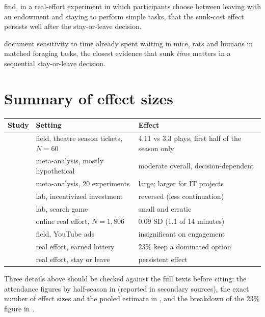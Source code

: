 \documentclass[11pt]{article}
\begin{document}
\citet{banerjee2019} find, in a real-effort experiment in which participants choose between leaving with an endowment and staying to perform simple tasks, that the sunk-cost effect persists well after the stay-or-leave decision.

\citet{sweis2018} document sensitivity to time already spent waiting in mice, rats and humans in matched foraging tasks, the closest evidence that sunk \emph{time} matters in a sequential stay-or-leave decision.

\section{Summary of effect sizes}

\begin{table}[h]
\centering\small
\begin{tabularx}{\textwidth}{@{}lXl@{}}
\toprule
Study & Setting & Effect \\
\midrule
\citet{arkes1985} & field, theatre season tickets, $N=60$ & 4.11 vs 3.3 plays, first half of the season only \\
\citet{roth2015} & meta-analysis, mostly hypothetical & moderate overall, decision-dependent \\
\citet{wang2007} & meta-analysis, 20 experiments & large; larger for IT projects \\
\citet{negrini2022} & lab, incentivized investment & reversed (less continuation) \\
\citet{friedman2007} & lab, search game & small and erratic \\
\citet{beknazar2025} & online real effort, $N=1{,}806$ & 0.09 SD (1.1 of 14 minutes) \\
\citet{beknazar2025} & field, YouTube ads & insignificant on engagement \\
\citet{ronayne2021} & real effort, earned lottery & 23\% keep a dominated option \\
\citet{banerjee2019} & real effort, stay or leave & persistent effect \\
\bottomrule
\end{tabularx}
\end{table}

Three details above should be checked against the full texts before citing: the attendance figures by half-season in \citet{arkes1985} (reported in secondary sources), the exact number of effect sizes and the pooled estimate in \citet{roth2015}, and the breakdown of the 23\% figure in \citet{ronayne2021}.
\end{document}
